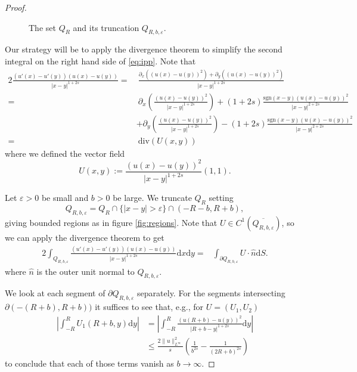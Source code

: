 \documentclass[11pt,a4paper]{amsart}
\newcommand{\R}{\mathbb{R}}
\newcommand{\dx}{\mathrm{d}x}
\newcommand{\dy}{\mathrm{d}y}
\newcommand{\sgn}{\mathrm{sgn}}
\renewcommand{\div}{\mathrm{div}}
\renewcommand{\epsilon}{\varepsilon}
\begin{document}
\begin{proof}
\begin{figure}
\caption{The set $Q_R$ and its truncation $Q_{R,b,\epsilon}$.}
\end{figure} 

Our strategy will be to apply the divergence theorem to simplify the second integral on the right hand side of \eqref{eq:ipp}. Note that
\begin{align*}
2\frac{(u'(x) - u'(y)) (u(x) - u(y))}{|x - y|^{1+2s}} =&~ \frac{\partial_x((u(x)- u(y))^2) + \partial_y((u(x)- u(y))^2)}{|x-y|^{1+2s}} \\
= &~ \partial_x\left(\frac{(u(x)- u(y))^2}{|x-y|^{1+2s}}\right) + (1+2s)\frac{\sgn(x-y)(u(x)- u(y))^2}{|x-y|^{2+2s}} \\
& + \partial_y\left(\frac{(u(x)- u(y))^2}{|x-y|^{1+2s}}\right) - (1+2s)\frac{\sgn(x-y)(u(x)- u(y))^2}{|x-y|^{2+2s}}\\
 = & ~\div(U(x,y))
\end{align*}
where we defined the vector field
\[U(x,y) := \frac{(u(x)- u(y))^2}{|x-y|^{1+2s}}(1,1).\]

Let $\epsilon>0$ be small and $b>0$ be large. We truncate $Q_R$ setting 
\[Q_{R, b, \epsilon} = Q_R \cap \{|x-y| >\epsilon\} \cap (-R-b, R+b),\] 
giving bounded regions as in figure \ref{fig:regions}. Note that $U \in C^1(\overline{Q_{R, b, \epsilon}})$, so we can apply the divergence theorem to get
\begin{align*}
2\int_{Q_{R,b,\epsilon}} \frac{(u'(x) - u'(y)) (u(x) - u(y))}{|x - y|^{1+2s}}\dx \dy =& \int_{\partial Q_{R, b, \epsilon}} U \cdot \hat{n} \mathrm{d}S.
\end{align*}
where $\hat{n}$ is the outer unit normal to $Q_{R,b,\epsilon}$.

We look at each segment of $\partial Q_{R,b,\epsilon}$ separately. For the segments intersecting $\partial(-(R+b), R+b))$ it suffices to see that, e.g., for $U = (U_1, U_2)$
\begin{align*}
\left|\int_{-R}^{R} U_1(R+b, y) \dy\right| &= \left|\int_{-R}^R \frac{(u(R+b)- u(y))^2}{|R+b - y|^{1+2s}}\dy \right|\\
&\leq \frac{2\|u\|_{L^{\infty}}^2}{s}\left( \frac{1}{b^{2s}} - \frac{1}{(2R + b)^{2s}} \right)
\end{align*} 
to conclude that each of those terms vanish as $b\rightarrow \infty$. 


\end{proof}
\end{document}
